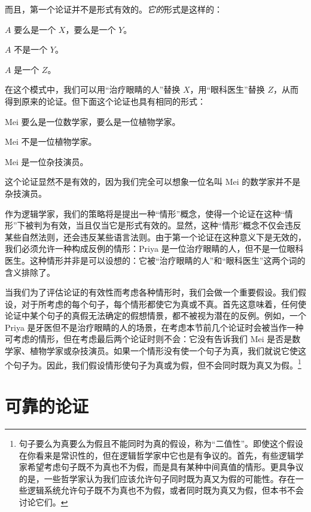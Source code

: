 而且，第一个论证并不是形式有效的。\emph{它的}形式是这样的：

\begin{earg}
	\item[] $A$ 要么是一个 $X$，要么是一个 $Y$。
	\item[] $A$ 不是一个 $Y$。
	\item[\texttherefore] $A$ 是一个 $Z$。
\end{earg}

在这个模式中，我们可以用“治疗眼睛的人”替换 $X$，用“眼科医生”替换 $Z$，从而得到原来的论证。但下面这个论证也具有相同的形式：

\begin{earg}
	\item[] Mei 要么是一位数学家，要么是一位植物学家。
	\item[] Mei 不是一位植物学家。
	\item[\texttherefore] Mei 是一位杂技演员。
\end{earg}

这个论证显然不是有效的，因为我们完全可以想象一位名叫 Mei 的数学家并不是杂技演员。

作为逻辑学家，我们的策略将是提出一种“情形”概念，使得一个论证在这种“情形”下被判为有效，当且仅当它是形式有效的。显然，这种“情形”概念不仅会违反某些自然法则，还会违反某些语言法则。由于第一个论证在这种意义下是无效的，我们必须允许一种构成反例的情形：Priya 是一位治疗眼睛的人，但不是一位眼科医生。这种情形并非是可以设想的：它被“治疗眼睛的人”和“眼科医生”这两个词的含义排除了。

当我们为了评估论证的有效性而考虑各种情形时，我们会做一个重要假设。我们假设，对于所考虑的每个句子，每个情形都使它为真或不真。首先这意味着，任何使论证中某个句子的真假无法确定的假想情景，都不被视为潜在的反例。例如，一个 Priya 是牙医但不是治疗眼睛的人的场景，在考虑本节前几个论证时会被当作一种可考虑的情形，但在考虑最后两个论证时则不会：它没有告诉我们 Mei 是否是数学家、植物学家或杂技演员。如果一个情形没有使一个句子为真，我们就说它使这个句子为。因此，我们假设情形使句子为真或为假，但不会同时既为真又为假。\footnote{句子要么为真要么为假且不能同时为真的假设，称为“二值性”。即使这个假设在你看来是常识性的，但在逻辑哲学家中它也是有争议的。首先，有些逻辑学家希望考虑句子既不为真也不为假，而是具有某种中间真值的情形。更具争议的是，一些哲学家认为我们应该允许句子同时既为真又为假的可能性。存在一些逻辑系统允许句子既不为真也不为假，或者同时既为真又为假，但本书不会讨论它们。}

\section{可靠的论证}

